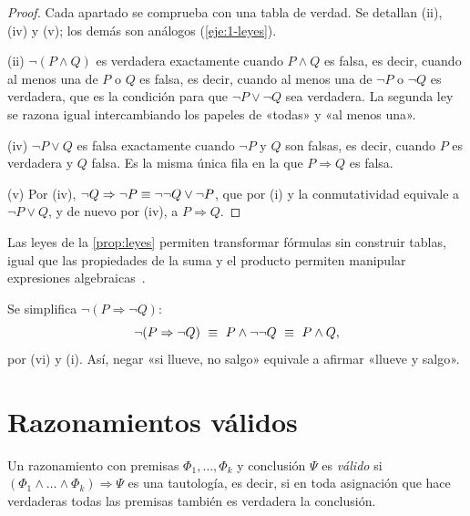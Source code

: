 \begin{proof}
Cada apartado se comprueba con una tabla de verdad. Se detallan (ii), (iv) y (v); los demás son análogos (\cref{eje:1-leyes}).

(ii) $\neg(P\wedge Q)$ es verdadera exactamente cuando $P\wedge Q$ es falsa, es decir, cuando al menos una de $P$ o $Q$ es falsa, es decir, cuando al menos una de $\neg P$ o $\neg Q$ es verdadera, que es la condición para que $\neg P\vee\neg Q$ sea verdadera. La segunda ley se razona igual intercambiando los papeles de «todas» y «al menos una».

(iv) $\neg P\vee Q$ es falsa exactamente cuando $\neg P$ y $Q$ son falsas, es decir, cuando $P$ es verdadera y $Q$ falsa. Es la misma única fila en la que $P\Rightarrow Q$ es falsa.

(v) Por (iv), $\neg Q\Rightarrow\neg P\equiv\neg\neg Q\vee\neg P$, que por (i) y la conmutatividad equivale a $\neg P\vee Q$, y de nuevo por (iv), a $P\Rightarrow Q$.
\end{proof}

Las leyes de la \cref{prop:leyes} permiten transformar fórmulas sin construir tablas, igual que las propiedades de la suma y el producto permiten manipular expresiones algebraicas~\cite[§3.4]{mcs}.

\begin{ejemplo}\label{ej:simplificar}
Se simplifica $\neg(P\Rightarrow\neg Q)$:
\[
\neg(P\Rightarrow\neg Q)\ \eqlog\ P\wedge\neg\neg Q\ \eqlog\ P\wedge Q,
\]
por (vi) y (i). Así, negar «si llueve, no salgo» equivale a afirmar «llueve y salgo».
\end{ejemplo}

\section{Razonamientos válidos}\label{sec:inferencia}

\begin{definicion}
Un razonamiento con premisas $\Phi_1,\dots,\Phi_k$ y conclusión $\Psi$ es \emph{válido} si $(\Phi_1\wedge\dots\wedge\Phi_k)\Rightarrow\Psi$ es una tautología, es decir, si en toda asignación que hace verdaderas todas las premisas también es verdadera la conclusión.
\end{definicion}

